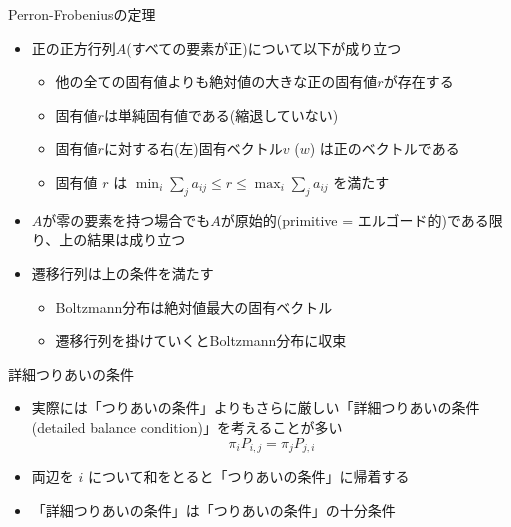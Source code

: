 \begin{frame}[t,fragile]{Perron-Frobeniusの定理}
  \begin{itemize}
  \item 正の正方行列$A$(すべての要素が正)について以下が成り立つ
    \begin{itemize}
      \item 他の全ての固有値よりも絶対値の大きな正の固有値$r$が存在する
      \item 固有値$r$は単純固有値である(縮退していない)
      \item 固有値$r$に対する右(左)固有ベクトル$v$ ($w$) は正のベクトルである
      \item 固有値 $r$ は $\displaystyle \min_i \sum_j a_{ij} \le r \le \max_i \sum_j a_{ij}$ を満たす
    \end{itemize}
  \item $A$が零の要素を持つ場合でも$A$が原始的(primitive = エルゴード的)である限り、上の結果は成り立つ
  \item 遷移行列は上の条件を満たす
    \begin{itemize}
    \item Boltzmann分布は絶対値最大の固有ベクトル
    \item 遷移行列を掛けていくとBoltzmann分布に収束
    \end{itemize}
  \end{itemize}
\end{frame}

\begin{frame}[t,fragile]{詳細つりあいの条件}
  \begin{itemize}
    \setlength{\itemsep}{1em}
  \item 実際には「つりあいの条件」よりもさらに厳しい「詳細つりあいの条件 (detailed balance condition)」を考えることが多い
    \[ \pi_i P_{i,j} = \pi_j P_{j,i} \]
  \item 両辺を $i$ について和をとると「つりあいの条件」に帰着する
  \item 「詳細つりあいの条件」は「つりあいの条件」の十分条件
  \end{itemize}
\end{frame}

